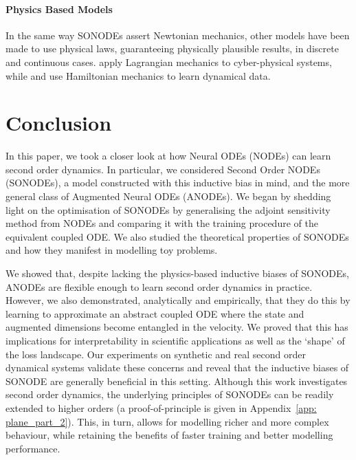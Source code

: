 \documentclass{article}
\theoremstyle{remark}
\theoremstyle{definition}
\begin{document}
\paragraph{Physics Based Models} In the same way SONODEs assert Newtonian mechanics, other models have been made to use physical laws, guaranteeing physically plausible results, in discrete and continuous cases. \citet{lutter2019deep} apply Lagrangian mechanics to cyber-physical systems, while \citet{greydanus2019hamiltonian} and \citet{zhong2019symplectic} use Hamiltonian mechanics to learn dynamical data. 

\section{Conclusion}

In this paper, we took a closer look at how Neural ODEs (NODEs) can learn second order dynamics. In particular, we considered Second Order NODEs (SONODEs), a model constructed with this inductive bias in mind, and the more general class of Augmented Neural ODEs (ANODEs). We began by shedding light on the optimisation of SONODEs by generalising the adjoint sensitivity method from NODEs and comparing it with the training procedure of the equivalent coupled ODE. We also studied the theoretical properties of SONODEs and how they manifest in modelling toy problems.

We showed that, despite lacking the physics-based inductive biases of SONODEs, ANODEs are flexible enough to learn second order dynamics in practice. However, we also demonstrated, analytically and empirically, that they do this by learning to approximate an abstract coupled ODE where the state and augmented dimensions become entangled in the velocity. We proved that this has implications for interpretability in scientific applications as well as the `shape' of the loss landscape. Our experiments on synthetic and real second order dynamical systems validate these concerns and reveal that the inductive biases of SONODE are generally beneficial in this setting. Although this work investigates second order dynamics, the underlying principles of SONODEs can be readily extended to higher orders (a proof-of-principle is given in Appendix~\ref{app: plane_part_2}). This, in turn, allows for modelling richer and more complex behaviour, while retaining the benefits of faster training and better modelling performance.



\clearpage
\end{document}
